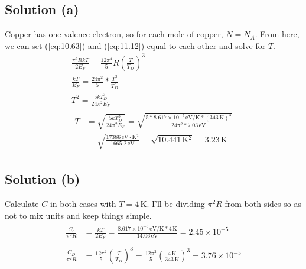 \documentclass[12pt]{article}
\newcommand{\E}[1]{\times 10^{#1}}
\begin{document}
    \subsection{Solution (a)}
        Copper has one valence electron, so for each mole of copper, $N = N_A$.
        From here, we can set (\ref{eq:10.63}) and (\ref{eq:11.12}) equal to each other and solve for $T$.
        \begin{gather}
            \frac{\pi^2 R k T}{2E_F} = \frac{12\pi^4}{5}R\left( \frac{T}{T_D} \right)^3\\
            \frac{kT}{E_F} = \frac{24\pi^2}{5} * \frac{T^3}{T_D^3}\\
            T^2 =   \frac{5kT_D^3}{24\pi^2 E_F}\\
            \begin{align}
                T   &=  \sqrt{\frac{5kT_D^3}{24\pi^2 E_F}}
                    =   \sqrt{\frac{5 * 8.617\E{-5}\,\unit{\eV/\kelvin} * (343\,\unit{\kelvin})^3}{24\pi^2 * 7.03\,\unit{\eV}}}\\
                    &=  \sqrt{\frac{17386\,\unit{\eV\cdot\kelvin^2}}{1665.2\,\unit{\eV}}}
                    =   \sqrt{10.441\,\unit{\kelvin^2}}
                    =   \boxed{3.23\,\unit{\kelvin}}
            \end{align}
        \end{gather}

    \subsection{Solution (b)}
        Calculate $C$ in both cases with $T = 4\,\unit{\kelvin}$.
        I'll be dividing $\pi^2 R$ from both sides so as not to mix units and keep things simple.
        \begin{gather}
            \begin{align}
                \frac{C_e}{\pi^2 R} &=  \frac{k T}{2 E_F}
                    =   \frac{8.617\E{-5}\,\unit{\eV/\kelvin} * 4\,\unit{\kelvin}}{14.06\,\unit{\eV}}
                    =   2.45\E{-5}
            \end{align}\\
            \begin{align}
                \frac{C_D}{\pi^2 R} &=  \frac{12\pi^2}{5}\left( \frac{T}{T_D} \right)^3
                    =   \frac{12\pi^2}{5}\left( \frac{4\,\unit{\kelvin}}{343\,\unit{\kelvin}} \right)^3
                    =   3.76\E{-5}
            \end{align}
        \end{gather}
\end{document}
